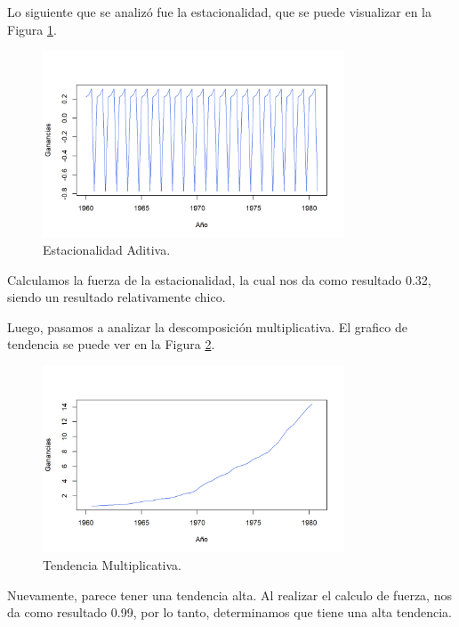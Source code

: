 \documentclass{article} %
\begin{document}
Lo siguiente que se analizó fue la estacionalidad, que se puede visualizar en la Figura \ref{fig:EstacionalidadAditiva}.

\begin{figure}[H]
	\centering
	\includegraphics[width=0.8\textwidth]{images/4-3 Estacionalidad Aditiva}
	\caption{Estacionalidad Aditiva.}
	\label{fig:EstacionalidadAditiva}
\end{figure} 

Calculamos la fuerza de la estacionalidad, la cual nos da como resultado 0.32, siendo un resultado relativamente chico.

Luego, pasamos a analizar la descomposición multiplicativa. El grafico de tendencia se puede ver en la Figura \ref{fig:TendenciaMultiplicativa}.

\begin{figure}[H]
	\centering
	\includegraphics[width=0.8\textwidth]{images/4-4 Tendencia Multiplicativa}
	\caption{Tendencia Multiplicativa.}
	\label{fig:TendenciaMultiplicativa}
\end{figure} 

Nuevamente, parece tener una tendencia alta. Al realizar el calculo de fuerza, nos da como resultado 0.99, por lo tanto, determinamos que tiene una alta tendencia.
\end{document}
